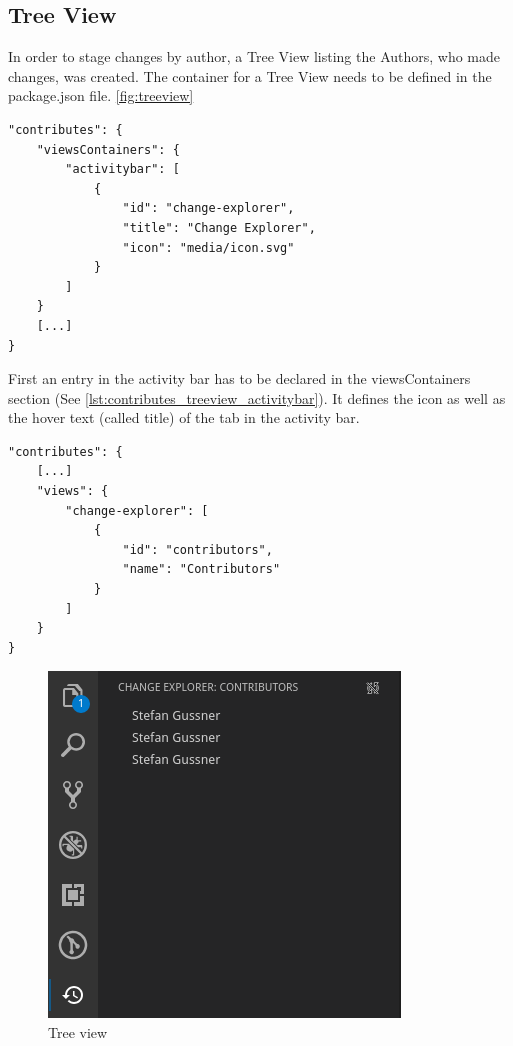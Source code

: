 \subsection{Tree View}

In order to stage changes by author, a Tree View listing the Authors, who made changes, was created.
The container for a Tree View needs to be defined in the package.json file. \autoref{fig:treeview}

\begin{minipage}{\linewidth}
\begin{lstlisting}[label={lst:contributes_treeview_activitybar}, caption=Tree View Activitybar]
"contributes": {
    "viewsContainers": {
        "activitybar": [
            {
                "id": "change-explorer",
                "title": "Change Explorer",
                "icon": "media/icon.svg"
            }
        ]
    }
    [...]
}
\end{lstlisting}
\end{minipage}

First an entry in the activity bar has to be declared in the viewsContainers section (See \autoref{lst:contributes_treeview_activitybar}). It defines the icon as well as the hover text (called title) of the tab in the activity bar.

\begin{lstlisting}[label={lst:contributes_treeview_view}, caption=Tree View Pannel Definition]
"contributes": {
    [...]
    "views": {
        "change-explorer": [
            {
                "id": "contributors",
                "name": "Contributors"
            }
        ]
    }
}
\end{lstlisting}

\begin{figure}[hb]
    \centering
    \includegraphics{figures/screenshots/treeview.png}
    \caption{Tree view}
    \label{fig:treeview}
\end{figure}

